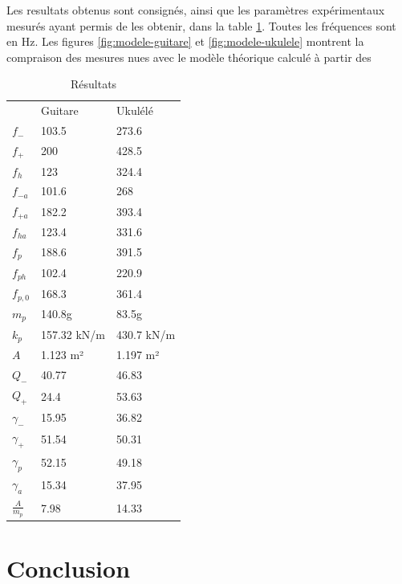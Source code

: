 \documentclass[atiam, article]{rapport} %
\begin{document}
Les resultats obtenus sont consignés, ainsi que les paramètres expérimentaux mesurés ayant permis de les obtenir, dans la table \ref{table:resultats}. Toutes les fréquences sont en Hz. Les figures \ref{fig:modele-guitare} et \ref{fig:modele-ukulele} montrent la compraison des mesures nues avec le modèle théorique calculé à partir des 

\begin{table}
\centering
\caption{Résultats}
\begin{tabular}{lll}
                & Guitare     & Ukulélé     \\
$f_-$           & 103.5       & 273.6       \\
$f_+$           & 200         & 428.5       \\
$f_h$           & 123         & 324.4       \\
$f_{-a}$        & 101.6       & 268         \\
$f_{+a}$        & 182.2       & 393.4       \\
$f_{ha}$        & 123.4       & 331.6       \\
$f_p$           & 188.6       & 391.5       \\
$f_{ph}$        & 102.4       & 220.9       \\
$f_{p,0}$       & 168.3       & 361.4       \\
$m_p$           & 140.8g      & 83.5g       \\
$k_p$           & 157.32 kN/m & 430.7 kN/m  \\
$A$             & 1.123 m²    & 1.197 m²    \\
$Q_-$           & 40.77       & 46.83       \\
$Q_+$           & 24.4        & 53.63       \\
$\gamma_-$      & 15.95       & 36.82       \\
$\gamma_+$      & 51.54       & 50.31       \\
$\gamma_p$      & 52.15       & 49.18       \\
$\gamma_a$      & 15.34       & 37.95       \\
$\frac{A}{m_p}$ & 7.98        & 14.33      
\end{tabular}
\label{table:resultats}
\end{table}

\section{Conclusion}

\printbibliography
\end{document}
